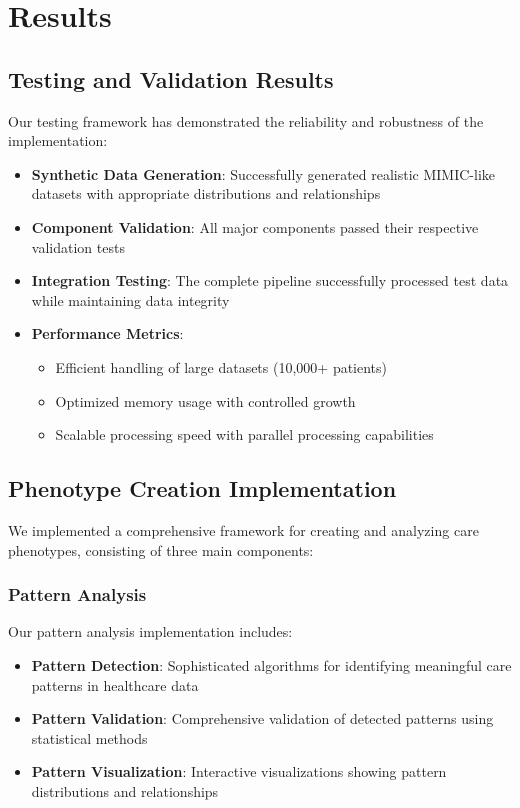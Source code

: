 \documentclass[12pt]{article}
\begin{document}
\section{Results}

\subsection{Testing and Validation Results}

Our testing framework has demonstrated the reliability and robustness of the implementation:

\begin{itemize}
    \item \textbf{Synthetic Data Generation}: Successfully generated realistic MIMIC-like datasets with appropriate distributions and relationships
    \item \textbf{Component Validation}: All major components passed their respective validation tests
    \item \textbf{Integration Testing}: The complete pipeline successfully processed test data while maintaining data integrity
    \item \textbf{Performance Metrics}:
    \begin{itemize}
        \item Efficient handling of large datasets (10,000+ patients)
        \item Optimized memory usage with controlled growth
        \item Scalable processing speed with parallel processing capabilities
    \end{itemize}
\end{itemize}

\subsection{Phenotype Creation Implementation}

We implemented a comprehensive framework for creating and analyzing care phenotypes, consisting of three main components:

\subsubsection{Pattern Analysis}

Our pattern analysis implementation includes:
\begin{itemize}
    \item \textbf{Pattern Detection}: Sophisticated algorithms for identifying meaningful care patterns in healthcare data
    \item \textbf{Pattern Validation}: Comprehensive validation of detected patterns using statistical methods
    \item \textbf{Pattern Visualization}: Interactive visualizations showing pattern distributions and relationships
\end{itemize}
\end{document}
